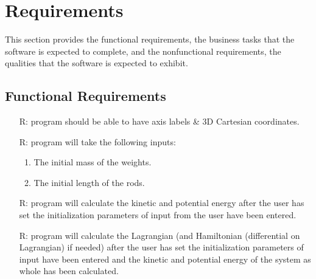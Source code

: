 \documentclass[12pt]{article}
\newcounter{reqnum} %
\begin{document}
\section{Requirements}

This section provides the functional requirements, the business tasks that the
software is expected to complete, and the nonfunctional requirements, the
qualities that the software is expected to exhibit.


\subsection{Functional Requirements}

\noindent \begin{itemize}

\item[R\refstepcounter{reqnum}\thereqnum \label{funinput}:] \progname 
program should be able to have axis labels \& 3D Cartesian coordinates. 

\item[R\refstepcounter{reqnum}\thereqnum \label{funinput}:] \progname program 
  will take the following inputs: 
  \begin{enumerate} \item The initial mass of the weights. 
                    \item The initial length of the rods.
  \end{enumerate}
                    
\item[R\refstepcounter{reqnum}\thereqnum \label{funkinpot}:] \progname program 
will calculate the kinetic and potential energy after the user has set the 
initialization parameters of input from the user have been entered.

\item[R\refstepcounter{reqnum}\thereqnum \label{funlagham}:] \progname program 
will calculate the Lagrangian (and Hamiltonian (differential on Lagrangian) 
if needed) after the user has set the initialization parameters of input 
have been entered and the kinetic and potential energy of the system as whole 
has been calculated. 


\end{itemize}
\end{document}
